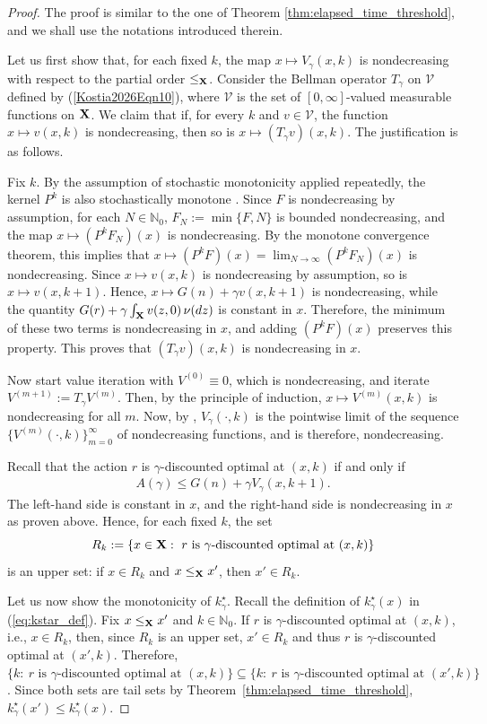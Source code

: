 \documentclass[letterpaper,10pt,conference]{ieeeconf}  %
\let\cal\mathcal
\begin{document}
\begin{proof}
The proof is similar to the one of Theorem \ref{thm:elapsed_time_threshold}, and we shall use the notations introduced therein. 

Let us first show that, for each fixed $k$, the map $x\mapsto {V_\gamma}(x,k)$ is nondecreasing
with respect to the partial order {$\le_{\bf X}$.}
{Consider the Bellman operator $T_\gamma$ on ${\cal V}$ defined by (\ref{Kostia2026Eqn10}), where ${\cal V}$ is the set of $[0,\infty]$-valued measurable functions on ${\bf X}$.}
We claim that if, for every $k$ {and $v\in {\cal V}$}, the function $x\mapsto v(x,k)$ is nondecreasing, 
then so is $x\mapsto (T_\gamma v)(x,k)$. {The justification is as follows.}

Fix $k$. By the assumption of stochastic monotonicity applied repeatedly, the kernel $P^k$ is also
stochastically monotone \cite{Daley1968}. Since $F$ is nondecreasing {by assumption}, {for each $N\in \mathbb{N}_0$, $F_N:=\min\{F,N\}$ is bounded nondecreasing, and the map $x\mapsto (P^kF_N)(x)$ is nondecreasing. By the monotone convergence theorem, this implies that}  $x\mapsto (P^kF)(x){=\lim_{N\rightarrow \infty}  (P^kF_N)(x)}$ is nondecreasing. 
Since $x\mapsto v(x,k)$ is nondecreasing {by assumption}, so is $x\mapsto v(x,k+1)$. Hence, $x\mapsto G(n)+\gamma v(x,k+1)$ 
is nondecreasing, while the quantity $G(r)+\gamma\int_{\bf X} v(z,0)\,\nu(dz)$ is constant in $x$. Therefore, 
the minimum of these two terms is nondecreasing in $x$, and adding $(P^kF)(x)$ preserves this property. 
This proves that $(T_\gamma v)(x,k)$ is nondecreasing {in $x$}.

Now start value iteration with ${V^{(0)}}\equiv 0$, which is nondecreasing, and iterate ${V^{(m+1)}}:=T_\gamma{V^{(m)}}$.
Then, by the principle of induction, $x\mapsto {V^{(m)}}(x,k)$ is nondecreasing for all $m$.
{Now, by \cite[Theorem 3.1]{FeinbergORL:2021}, $V_\gamma(\cdot,k)$ is} 
the pointwise limit of the sequence {$\{V^{(m)}(\cdot,k)\}_{m=0}^\infty$} of nondecreasing functions, and is therefore, nondecreasing.

{Recall that the} action $r$ is {$\gamma$-discounted} optimal at $(x,k)$ if and only if
\begin{align*}
{A(\gamma)} \le G(n)+\gamma {V_\gamma}(x,k+1).
\end{align*}
The left-hand side is constant in $x$, and the right-hand side is nondecreasing in $x$ as proven above. 
Hence, for each fixed $k$, the set
\[
R_k:=\{x\in {\bf X}:\ \text{$r$ is {$\gamma$-discounted optimal} at }(x,k)\}
\]
is an upper set: if $x\in R_k$ and {$x\le_{\bf X} x'$}, then $x'\in R_k$.

Let us now show the monotonicity of $k^\star_\gamma$. Recall the definition
of $k^\star_\gamma(x)$ in (\ref{eq:kstar_def}).
Fix $x\le_{\bf X}x'$ and $k\in \mathbb{N}_0$. If $r$ is $\gamma$-discounted optimal at $(x,k)$, 
i.e., $x\in R_k$, then, since $R_k$ is an upper set, $x'\in R_k$ and thus $r$ is $\gamma$-discounted optimal at $(x',k)$.
Therefore, 
$\{k:\ r\mbox{ is $\gamma$-discounted optimal at }(x,k)\}\subseteq \{k:\ r\mbox{ is $\gamma$-discounted optimal at }(x',k)\}$. Since both sets are tail sets by Theorem~\ref{thm:elapsed_time_threshold}, $k^\star_\gamma(x')\le k^\star_\gamma(x)$.
\end{proof}
\end{document}
